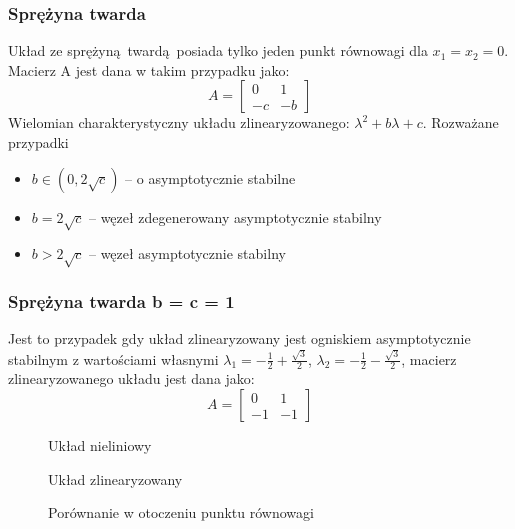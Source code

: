\documentclass[a4paper, 10pt]{article}
\begin{document}
			\subsubsection{Sprężyna twarda}
				Układ ze sprężyną twardą posiada tylko jeden punkt równowagi dla $x_1 = x_2 = 0$. Macierz A jest dana w takim przypadku jako:
				$$
					A = \begin{bmatrix}
						0 & 1 \\
						-c  & -b
					\end{bmatrix}
				$$
				Wielomian charakterystyczny układu zlinearyzowanego: $\lambda^2 + b \lambda + c$. Rozważane przypadki
				\begin{itemize}
					\item[] $b \in (0, 2\sqrt{c}) $ -- o asymptotycznie stabilne
					\item[] $b = 2 \sqrt{c}$ -- węzeł zdegenerowany asymptotycznie stabilny
					\item[]	$b > 2\sqrt{c}$ -- węzeł asymptotycznie stabilny
				\end{itemize}
				
			\subsubsection{Sprężyna twarda b = c = 1}
				Jest to przypadek gdy układ zlinearyzowany jest ogniskiem asymptotycznie stabilnym z wartościami własnymi $\lambda_1 = -\frac{1}{2} + \frac{\sqrt{3}}{2}$, $\lambda_2 = -\frac{1}{2} - \frac{\sqrt{3}}{2}$, macierz zlinearyzowanego układu jest dana jako:
				$$
				A = \begin{bmatrix}
				0 & 1 \\
				-1  & -1
				\end{bmatrix}
				$$
				\begin{figure}[H]
					\centering
					\def \svgwidth{0.8\columnwidth}
					
					\caption{Układ nieliniowy}
				\end{figure}\noindent
				
				
				\begin{figure}[H]
					\centering
					\def \svgwidth{0.8\columnwidth}
					
					\caption{Układ zlinearyzowany}
				\end{figure}\noindent
				
				
				\begin{figure}[H]
					\centering
					\def \svgwidth{0.8\columnwidth}
					
					\caption{Porównanie w otoczeniu punktu równowagi}
				\end{figure}\noindent
				
\end{document}
